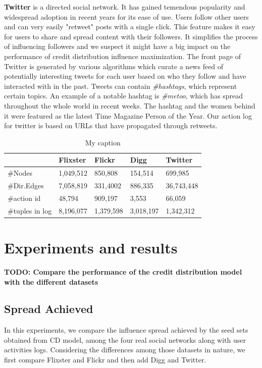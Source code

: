 \documentclass{acm_proc_article-sp}
\begin{document}
\textbf{Twitter} \cite{data:twitter} is a directed social network. It has gained temendous popularity and widespread adoption in recent years for its ease of use. Users follow other users and can very easily "retweet" posts with a single click. This feature makes it easy for users to share and spread content with their followers. It simplifies the process of influencing followers and we suspect it might have a big impact on the performance of credit distribution influence maximization. The front page of Twitter is generated by various algorithms which curate a news feed of potentially interesting tweets for each user based on who they follow and have interacted with in the past. Tweets can contain \textit{\#hashtags}, which represent certain topics. An example of a notable hashtag is \textit{\#metoo}, which has spread throughout the whole world in recent weeks. The hashtag and the women behind it were featured as the latest Time Magazine Person of the Year. Our action log for twitter is based on URLs that have propagated through retweets.


 \cite{DBLP:journals/corr/abs-1202-3162}
\begin{table}[]
	\centering
	\caption{My caption}
	\label{my-label}
	\begin{tabular}{|l|l|l|l|l|}
		\hline
		& Flixster  & Flickr    & Digg      & Twitter    \\ \hline
		\#Nodes         & 1,049,512 & 850,808   & 154,514   & 699,985    \\ \hline
		\#Dir.Edges     & 7,058,819 & 331,4002  & 886,335   & 36,743,448 \\ \hline
		\#action id     & 48,794    & 909,197   & 3,553     & 66,059     \\ \hline
		\#tuples in log & 8,196,077 & 1,379,598 & 3,018,197 & 1,342,312  \\ \hline
	\end{tabular}
\end{table}

\section{Experiments and results}
\textbf{TODO: Compare the performance of the credit distribution model with the different datasets}

\subsection*{Spread Achieved}
In this experiments, we compare the influence spread achieved by the seed sets obtained from CD model, among the four real social networks along with user activities logs. Considering the differences among those datasets in nature, we first compare Flixster and Flickr and then add Digg and Twitter.
\end{document}
